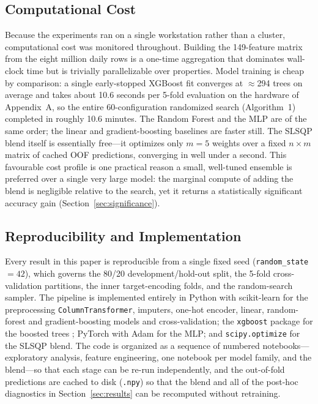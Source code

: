 \documentclass[journal]{IEEEtran}
\begin{document}
\subsection{Computational Cost}
\label{sec:cost}
Because the experiments ran on a single workstation rather than a cluster,
computational cost was monitored throughout. Building the 149-feature matrix from the eight
million daily rows is a one-time aggregation that dominates wall-clock time but
is trivially parallelizable over properties. Model training is cheap by
comparison: a single early-stopped XGBoost fit converges at $\approx$294 trees
on average and takes about 10.6 seconds per 5-fold evaluation on the hardware of Appendix~A, so
the entire 60-configuration randomized search (Algorithm~1)
completed in roughly 10.6 minutes. The Random Forest and the MLP are of the same
order; the linear and gradient-boosting baselines are faster still. The SLSQP
blend itself is essentially free---it optimizes only $m=5$ weights over a fixed
$n\times m$ matrix of cached OOF predictions, converging in well under a second.
This favourable cost profile is one practical reason a small,
well-tuned ensemble is preferred over a single very large model: the marginal compute of
adding the blend is negligible relative to the search, yet it returns a
statistically significant accuracy gain (Section~\ref{sec:significance}).

\subsection{Reproducibility and Implementation}
\label{sec:repro}
Every result in this paper is reproducible from a single fixed seed
(\texttt{random\_state}~$=42$), which governs the 80/20 development/hold-out
split, the 5-fold cross-validation partitions, the inner target-encoding folds,
and the random-search sampler. The pipeline is implemented entirely in Python
with scikit-learn \cite{pedregosa2011sklearn} for the preprocessing
\texttt{ColumnTransformer}, imputers, one-hot encoder, linear, random-forest and
gradient-boosting models and cross-validation; the \texttt{xgboost} package for
the boosted trees \cite{chen2016xgboost}; PyTorch \cite{paszke2019pytorch} with
Adam \cite{kingma2015adam} for the MLP; and \texttt{scipy.optimize} for the SLSQP
blend. The code is organized as a sequence of numbered notebooks---exploratory
analysis, feature engineering, one notebook per model family, and the blend---so
that each stage can be re-run independently, and the out-of-fold predictions are
cached to disk (\texttt{.npy}) so that the blend and all of the post-hoc
diagnostics in Section~\ref{sec:results} can be recomputed without retraining.
\end{document}

